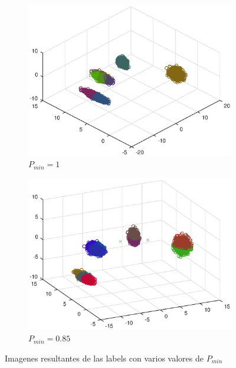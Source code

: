 \documentclass[11pt]{article} %
\begin{document}
\begin{figure}[h]
\begin{subfigure}[b]{0.435\textwidth}
                \includegraphics[width=\textwidth]{../src/fig/21_9_clusters.eps}
                \caption[]{\small $P_{min} = 1$}
                \label{fig:db:100}
        \end{subfigure}
        \quad
        \begin{subfigure}[b]{0.435\textwidth}
                \includegraphics[width=\textwidth]{../src/fig/21_10_clusters.eps}
                \caption[]{\small $P_{min} = 0.85$}
                \label{fig:db:085}
        \end{subfigure}
	\caption{Imagenes resultantes de las labels con varios valores de $P_{min}$}
	\label{fig:db}
\end{figure}
\end{document}
